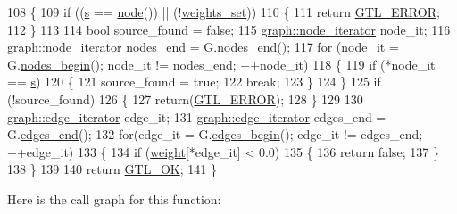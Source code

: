 \begin{DoxyCode}
108 \{
109     \textcolor{keywordflow}{if} ((\mbox{\hyperlink{classdijkstra_a721bfb648626a1be2b9d276d85ebdb9d}{s}} == \mbox{\hyperlink{classnode}{node}}()) || (!\mbox{\hyperlink{classdijkstra_ad60e0abd80def985afa753b7dadef771}{weights\_set}}))
110     \{
111     \textcolor{keywordflow}{return} \mbox{\hyperlink{classalgorithm_af1a0078e153aa99c24f9bdf0d97f6710a6fcf574690bbd6cf710837a169510dd7}{GTL\_ERROR}};
112     \}
113 
114     \textcolor{keywordtype}{bool} source\_found = \textcolor{keyword}{false};
115     \mbox{\hyperlink{classgraph_a2cb374b84c133ce13f94e73c3e5da7fa}{graph::node\_iterator}} node\_it;
116     \mbox{\hyperlink{classgraph_a2cb374b84c133ce13f94e73c3e5da7fa}{graph::node\_iterator}} nodes\_end = G.\mbox{\hyperlink{classgraph_abbf9c0cb5629e98e1142254911238173}{nodes\_end}}();
117     \textcolor{keywordflow}{for} (node\_it = G.\mbox{\hyperlink{classgraph_aec053a4b509d1be804237a80044c54c0}{nodes\_begin}}(); node\_it != nodes\_end; ++node\_it)
118     \{
119     \textcolor{keywordflow}{if} (*node\_it == \mbox{\hyperlink{classdijkstra_a721bfb648626a1be2b9d276d85ebdb9d}{s}})
120         \{
121         source\_found = \textcolor{keyword}{true};
122         \textcolor{keywordflow}{break};
123     \}
124     \}
125     \textcolor{keywordflow}{if} (!source\_found)
126     \{
127     \textcolor{keywordflow}{return}(\mbox{\hyperlink{classalgorithm_af1a0078e153aa99c24f9bdf0d97f6710a6fcf574690bbd6cf710837a169510dd7}{GTL\_ERROR}});
128     \}
129 
130     \mbox{\hyperlink{classgraph_a818d3766018eb0af91d520ce2150203c}{graph::edge\_iterator}} edge\_it;
131     \mbox{\hyperlink{classgraph_a818d3766018eb0af91d520ce2150203c}{graph::edge\_iterator}} edges\_end = G.\mbox{\hyperlink{classgraph_aea8d7f976b85b6137f52d915e26639f6}{edges\_end}}();
132     \textcolor{keywordflow}{for}(edge\_it = G.\mbox{\hyperlink{classgraph_a7ba35a4c4e8343ffb27ed6d9703c6f18}{edges\_begin}}(); edge\_it != edges\_end; ++edge\_it)
133     \{
134     \textcolor{keywordflow}{if} (\mbox{\hyperlink{classdijkstra_ac077e6b471b7178d7aef78e54c6a07cf}{weight}}[*edge\_it] < 0.0)
135     \{
136         \textcolor{keywordflow}{return} \textcolor{keyword}{false};
137     \}
138     \}
139 
140     \textcolor{keywordflow}{return} \mbox{\hyperlink{classalgorithm_af1a0078e153aa99c24f9bdf0d97f6710a5114c20e4a96a76b5de9f28bf15e282b}{GTL\_OK}};
141 \}
\end{DoxyCode}
Here is the call graph for this function\+:\nopagebreak
